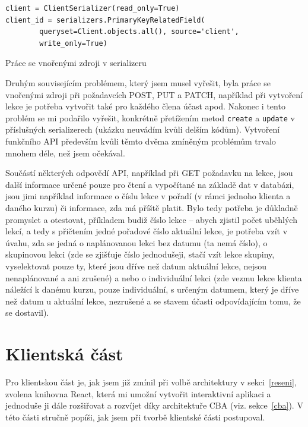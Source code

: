     \begin{listing}[ht]
    	\begin{verbatim}
client = ClientSerializer(read_only=True)
client_id = serializers.PrimaryKeyRelatedField(
        queryset=Client.objects.all(), source='client',
        write_only=True)
    	\end{verbatim}
    	\caption{Práce se vnořenými zdroji v serializeru}\label{lst:apiserializer2}
    \end{listing}
    
    Druhým souvisejícím problémem, který jsem musel vyřešit, byla práce se vnořenými zdroji při požadavcích POST, PUT a PATCH, například při vytvoření lekce je potřeba vytvořit také pro každého člena účast apod. Nakonec i tento problém se mi podařilo vyřešit, konkrétně přetížením metod \verb|create| a \verb|update| v příslušných serializerech (ukázku neuvádím kvůli delším kódům). Vytvoření funkčního API především kvůli těmto dvěma zmíněným problémům trvalo mnohem déle, než jsem očekával.
    
    Součástí některých odpovědí API, například při GET požadavku na lekce, jsou další informace určené pouze pro čtení a vypočítané na základě dat v databázi, jsou jimi například informace o číslu lekce v pořadí (v rámci jednoho klienta a daného kurzu) či informace, zda má příště platit. Bylo tedy potřeba je důkladně promyslet a otestovat, příkladem budiž číslo lekce -- abych zjistil počet uběhlých lekcí, a tedy s přičtením jedné pořadové číslo aktuální lekce, je potřeba vzít v úvahu, zda se jedná o naplánovanou lekci bez datumu (ta nemá číslo), o skupinovou lekci (zde se zjišťuje číslo jednodušeji, stačí vzít lekce skupiny, vyselektovat pouze ty, které jsou dříve než datum aktuální lekce, nejsou nenaplánované a ani zrušené) a nebo o individuální lekci (zde vezmu lekce klienta náležící k danému kurzu, pouze individuální, s určeným datumem, který je dříve než datum u aktuální lekce, nezrušené a se stavem účasti odpovídajícím tomu, že se dostavil).
    
    \section{Klientská část}
    Pro klientskou část je, jak jsem již zmínil při volbě architektury v sekci~\ref{reseni}, zvolena knihovna React, která mi umožní vytvořit interaktivní aplikaci a jednoduše ji dále rozšiřovat a rozvíjet díky architektuře CBA (viz. sekce~\ref{cba}). V této části stručně popíši, jak jsem při tvorbě klientské části postupoval.
    
